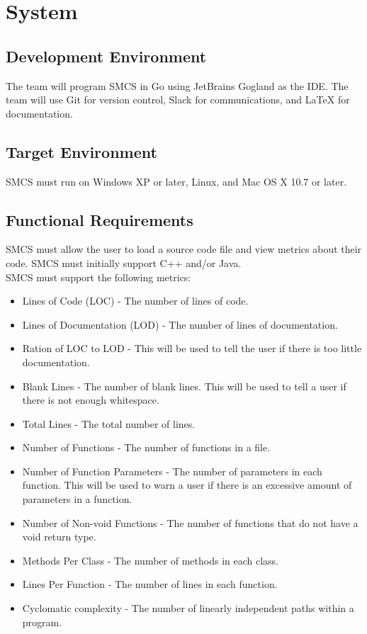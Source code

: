 \documentclass{scrreprt}
\begin{document}
	\chapter{System}
	\section{Development Environment}
	The team will program SMCS in Go using JetBrains Gogland as the IDE. The team will use Git for version control, Slack for communications, and LaTeX for documentation.
	\section{Target Environment}
	SMCS must run on Windows XP or later, Linux, and Mac OS X 10.7 or later.
	\section{Functional Requirements}
	SMCS must allow the user to load a source code file and view metrics about their code. SMCS must initially support C++ and/or Java.\\
	SMCS must support the following metrics:
	\begin{itemize}
		\item Lines of Code (LOC) - The number of lines of code.
		\item Lines of Documentation (LOD) - The number of lines of documentation.
		\item Ration of LOC to LOD - This will be used to tell the user if there is too little documentation.
		\item Blank Lines - The number of blank lines. This will be used to tell a user if there is not enough whitespace.
		\item Total Lines - The total number of lines.
		\item Number of Functions - The number of functions in a file.
		\item Number of Function Parameters - The number of parameters in each function. This will be used to warn a user if there is an excessive amount of parameters in a function.
		\item Number of Non-void Functions - The number of functions that do not have a void return type.
		\item Methods Per Class - The number of methods in each class.
		\item Lines Per Function - The number of lines in each function.
		\item Cyclomatic complexity - The number of linearly independent paths within a program.
	\end{itemize}
\end{document}
